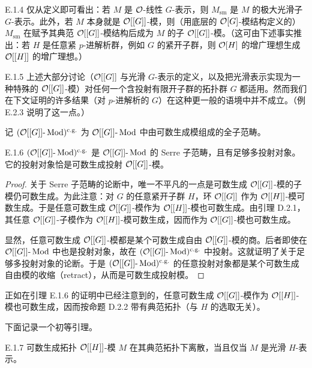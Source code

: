 \begin{rem}{E.1.4}\label{thm:a4-20-6}
仅从定义即可看出：若 $M$ 是 $\mathcal{O}$-线性 $G$-表示，则 $M_{\mathrm{sm}}$ 是 $M$ 的极大光滑子 $G$-表示。此外，若 $M$ 本身就是 $\mathcal{O}[[G]]$-模，则（用底层的 $\mathcal{O}[G]$-模结构定义的）$M_{\mathrm{sm}}$ 在赋予其典范 $\mathcal{O}[[G]]$-模结构后成为 $M$ 的子 $\mathcal{O}[[G]]$-模。（这可由下述事实推出：若 $H$ 是任意紧 $p$-进解析群，例如 $G$ 的紧开子群，则 $\mathcal{O}[H]$ 的增广理想生成 $\mathcal{O}[[H]]$ 的增广理想。）
\end{rem}

\begin{rem}{E.1.5}\label{thm:a4-20-7}
上述大部分讨论（$\mathcal{O}[[G]]$ 与光滑 $G$-表示的定义，以及把光滑表示实现为一种特殊的 $\mathcal{O}[[G]]$-模）对任何一个含投射有限开子群的拓扑群 $G$ 都适用。然而我们在下文证明的许多结果（对 $p$-进解析的 $G$）在这种更一般的语境中并不成立。（例 E.2.3 说明了这一点。）
\end{rem}


记 $(\mathcal{O}[[G]]\text{-}\operatorname{Mod})^{\mathrm{c.g.}}$ 为 $\mathcal{O}[[G]]\text{-}\operatorname{Mod}$ 中由可数生成模组成的全子范畴。

\begin{lem}{E.1.6}\label{thm:a4-20-8}
$(\mathcal{O}[[G]]\text{-}\operatorname{Mod})^{\mathrm{c.g.}}$ 是 $\mathcal{O}[[G]]\text{-}\operatorname{Mod}$ 的 Serre 子范畴，且有足够多投射对象。它的投射对象恰是可数生成投射 $\mathcal{O}[[G]]$-模。
\end{lem}

\begin{proof}
关于 Serre 子范畴的论断中，唯一不平凡的一点是可数生成 $\mathcal{O}[[G]]$-模的子模仍可数生成。为此注意：对 $G$ 的任意紧开子群 $H$，环 $\mathcal{O}[[G]]$ 作为 $\mathcal{O}[[H]]$-模可数生成。于是任意可数生成 $\mathcal{O}[[G]]$-模作为 $\mathcal{O}[[H]]$-模也可数生成。由引理 D.2.1，其任意 $\mathcal{O}[[G]]$-子模作为 $\mathcal{O}[[H]]$-模可数生成，因而作为 $\mathcal{O}[[G]]$-模也可数生成。

显然，任意可数生成 $\mathcal{O}[[G]]$-模都是某个可数生成自由 $\mathcal{O}[[G]]$-模的商。后者即使在 $\mathcal{O}[[G]]\text{-}\operatorname{Mod}$ 中也是投射对象，故在 $(\mathcal{O}[[G]]\text{-}\operatorname{Mod})^{\mathrm{c.g.}}$ 中投射。这就证明了关于足够多投射对象的论断。于是 $(\mathcal{O}[[G]]\text{-}\operatorname{Mod})^{\mathrm{c.g.}}$ 的任意投射对象都是某个可数生成自由模的收缩（retract），从而是可数生成投射模。
\end{proof}

正如在引理 E.1.6 的证明中已经注意到的，任意可数生成 $\mathcal{O}[[G]]$-模作为 $\mathcal{O}[[H]]$-模也可数生成，因而按命题 D.2.2 带有典范拓扑（与 $H$ 的选取无关）。

下面记录一个初等引理。

\begin{lem}{E.1.7}\label{thm:a4-20-9}
可数生成拓扑 $\mathcal{O}[[H]]$-模 $M$ 在其典范拓扑下离散，当且仅当 $M$ 是光滑 $H$-表示。
\end{lem}

